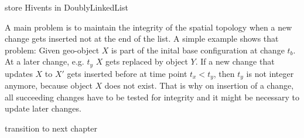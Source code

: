 store Hivents in DoublyLinkedList



A main problem is to maintain the integrity of the spatial topology when a new change gets inserted not at the end of the list. A simple example shows that problem: Given geo-object $X$ is part of the inital base configuration at change $t_b$. At a later change, e.g. $t_y$ $X$ gets replaced by object $Y$. If a new change that updates $X$ to $X'$ gets inserted before at time point $t_x < t_y$, then $t_y$ is not integer anymore, because object $X$ does not exist. That is why on insertion of a change, all succeeding changes have to be tested for integrity and it might be necessary to update later changes.






\vspace{2em}
transition to next chapter